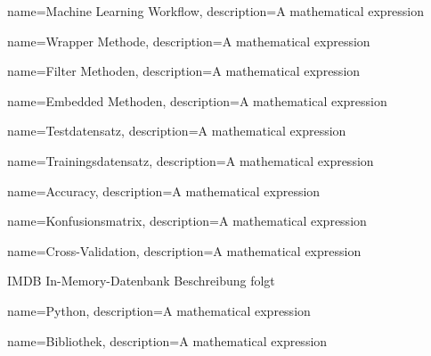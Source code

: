 {
        name=Machine Learning Workflow,
        description={A mathematical expression}
}

{
        name=Wrapper Methode,
        description={A mathematical expression}
}

{
        name=Filter Methoden,
        description={A mathematical expression}
}

{
        name=Embedded Methoden,
        description={A mathematical expression}
}

{
        name=Testdatensatz,
        description={A mathematical expression}
}

{
        name=Trainingsdatensatz,
        description={A mathematical expression}
}

{
        name=Accuracy,
        description={A mathematical expression}
}

{
        name=Konfusionsmatrix,
        description={A mathematical expression}
}

{
        name=Cross-Validation,
        description={A mathematical expression}
}


\newglossaryentrywithacronym
{IMDB}
{In-Memory-Datenbank}
{Beschreibung folgt}



{
        name=Python,
        description={A mathematical expression}
}

{
        name=Bibliothek,
        description={A mathematical expression}
}











